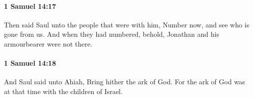 		\paragraph{1 Samuel 14:17} %
			\label{1SAMUEL-14-17}

			Then said Saul unto the people that were with him, Number now, and see who is gone from us. And when they had numbered, behold, Jonathan and his armourbearer were not there.


		\paragraph{1 Samuel 14:18} %
			\label{1SAMUEL-14-18}

			And Saul said unto Ahiah, Bring hither the ark of God. For the ark of God was at that time with the children of Israel.


